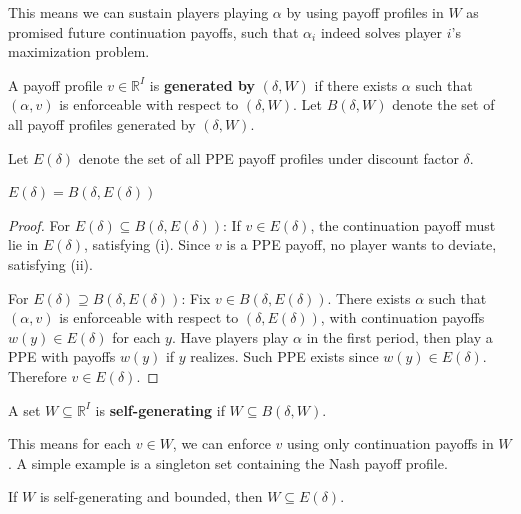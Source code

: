 \documentclass[11pt]{elegantbook_2}
\begin{document}
This means we can sustain players playing $\alpha$ by using payoff profiles in $W$ as promised future continuation payoffs, such that $\alpha_i$ indeed solves player $i$'s maximization problem.

\begin{definition}
    A payoff profile $v\in\mathbb{R}^I$ is \textbf{generated by} $(\delta,W)$ if there exists $\alpha$ such that $(\alpha,v)$ is enforceable with respect to $(\delta,W)$. Let $B(\delta,W)$ denote the set of all payoff profiles generated by $(\delta,W)$.
\end{definition}

Let $E(\delta)$ denote the set of all PPE payoff profiles under discount factor $\delta$.

\begin{theorem}
    $E(\delta)=B(\delta,E(\delta))$
\end{theorem}

\begin{proof}
    For $E(\delta)\subseteq B(\delta,E(\delta))$: If $v\in E(\delta)$, the continuation payoff must lie in $E(\delta)$, satisfying (i). Since $v$ is a PPE payoff, no player wants to deviate, satisfying (ii).
    
    For $E(\delta)\supseteq B(\delta,E(\delta))$: Fix $v\in B(\delta,E(\delta))$. There exists $\alpha$ such that $(\alpha,v)$ is enforceable with respect to $(\delta,E(\delta))$, with continuation payoffs $w(y)\in E(\delta)$ for each $y$. Have players play $\alpha$ in the first period, then play a PPE with payoffs $w(y)$ if $y$ realizes. Such PPE exists since $w(y)\in E(\delta)$. Therefore $v\in E(\delta)$.
\end{proof}

\begin{definition}
    A set $W\subseteq\mathbb{R}^I$ is \textbf{self-generating} if $W\subseteq B(\delta,W)$.
\end{definition}

This means for each $v\in W$, we can enforce $v$ using only continuation payoffs in $W$. A simple example is a singleton set containing the Nash payoff profile.

\begin{theorem}
    If $W$ is self-generating and bounded, then $W\subseteq E(\delta)$.
\end{theorem}
\end{document}
